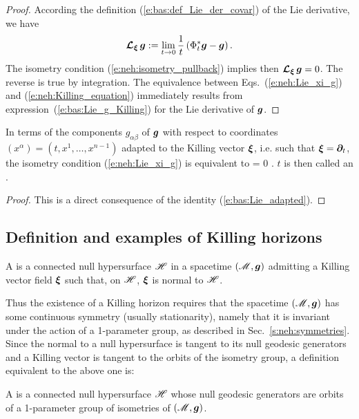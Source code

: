 \begin{proof}
According the definition (\ref{e:bas:def_Lie_der_covar}) of the Lie
derivative, we have
\[
    \bm{\mathcal{L}}_{\bm{\xi}}\, \bm{g} := \lim_{t \rightarrow 0} \frac{1}{t}
    \left( \Phi_t^*\bm{g} - \bm{g} \right) .
\]
The isometry condition
(\ref{e:neh:isometry_pullback}) implies then
$\bm{\mathcal{L}}_{\bm{\xi}}\,\bm{g} = 0$. The reverse is true by integration.
The equivalence between Eqs.~(\ref{e:neh:Lie_xi_g})
and (\ref{e:neh:Killing_equation}) immediately results from
expression~(\ref{e:bas:Lie_g_Killing}) for the Lie derivative of
$\bm{g}$.
\end{proof}

\begin{prop}
\label{p:neh:isometry_adapt_coord}
In terms of the components $g_{\alpha\beta}$ of $\bm{g}$ with respect to
coordinates $(x^\alpha) = (t,x^1,\ldots,x^{n-1})$ adapted to the Killing vector $\bm{\xi}$,
i.e. such that $\bm{\xi} = \bm{\partial}_t$, the isometry condition (\ref{e:neh:Lie_xi_g})
is equivalent to
\be \label{e:neh:dgabdt_zero}
     = 0 .
\ee
$t$ is then called an .
\end{prop}
\begin{proof}
This is a direct consequence of the identity (\ref{e:bas:Lie_adapted}).
\end{proof}


\subsection{Definition and examples of Killing horizons} \label{s:neh:def_Killing_hor}

\begin{greybox}
A  is
a connected null hypersurface $\mathscr{H}$ in a spacetime $(\mathscr{M},\bm{g})$ admitting a
Killing vector field $\bm{\xi}$ such that, on $\mathscr{H}$, $\bm{\xi}$ is
normal to $\mathscr{H}$.
\end{greybox}

Thus the existence of a Killing horizon requires that the spacetime $(\mathscr{M},\bm{g})$ has
some continuous symmetry
(usually stationarity), namely that it is invariant under the action of a
1-parameter group, as described in Sec.~\ref{s:neh:symmetries}.
Since the normal to a null hypersurface is tangent to its null geodesic
generators and a Killing vector is tangent to the orbits of the isometry group,
a definition equivalent to the above one is:
\begin{greybox}
A  is a connected null
hypersurface $\mathscr{H}$ whose null geodesic generators are orbits of a
1-parameter group of isometries of $(\mathscr{M},\bm{g})$.
\end{greybox}

